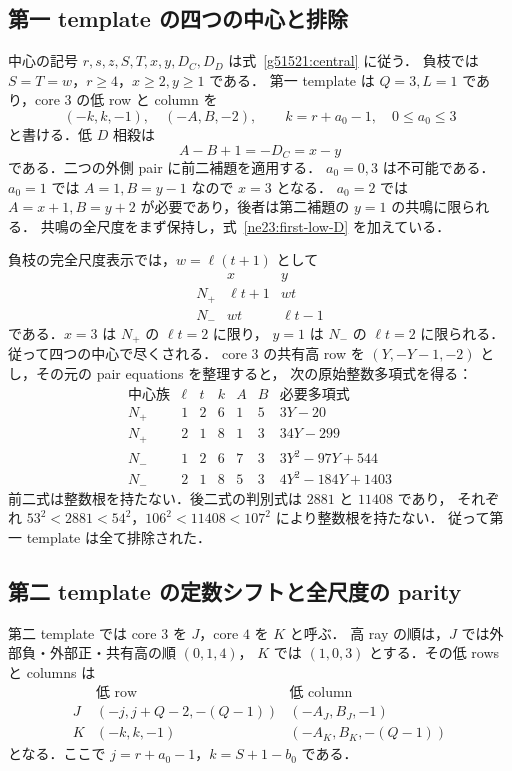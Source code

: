 \subsection{第一 template の四つの中心と排除}

中心の記号 $r,s,z,S,T,x,y,D_C,D_D$ は式~\eqref{g51521:central} に従う．
負枝では $S=T=w$，$r\ge4$，$x\ge2,y\ge1$ である．
第一 template は $Q=3,L=1$ であり，core $3$ の低 row と column を
\[
 (-k,k,-1),\quad (-A,B,-2),\qquad k=r+a_0-1,\quad0\le a_0\le3
\]
と書ける．低 $D$ 相殺は
\begin{equation}\label{ne23:first-low-D}
 A-B+1=-D_C=x-y
\end{equation}
である．二つの外側 pair に前二補題を適用する．
$a_0=0,3$ は不可能である．$a_0=1$ では $A=1,B=y-1$ なので $x=3$ となる．
$a_0=2$ では $A=x+1,B=y+2$ が必要であり，後者は第二補題の $y=1$ の共鳴に限られる．
共鳴の全尺度をまず保持し，式~\eqref{ne23:first-low-D} を加えている．

負枝の完全尺度表示では，$w=\ell(t+1)$ として
\[
\begin{array}{c|cc}
&x&y\\\hline
N_+&\ell t+1&wt\\
N_-&wt&\ell t-1
\end{array}
\]
である．$x=3$ は $N_+$ の $\ell t=2$ に限り，
$y=1$ は $N_-$ の $\ell t=2$ に限られる．従って四つの中心で尽くされる．
core $3$ の共有高 row を $(Y,-Y-1,-2)$ とし，その元の pair equations を整理すると，
次の原始整数多項式を得る：
\[
\begin{array}{c|cc|ccc|l}
\text{中心族}&\ell&t&k&A&B&\text{必要多項式}\\\hline
N_+&1&2&6&1&5&3Y-20\\
N_+&2&1&8&1&3&34Y-299\\
N_-&1&2&6&7&3&3Y^2-97Y+544\\
N_-&2&1&8&5&3&4Y^2-184Y+1403
\end{array}
\]
前二式は整数根を持たない．後二式の判別式は $2881$ と $11408$ であり，
それぞれ $53^2<2881<54^2$，$106^2<11408<107^2$ により整数根を持たない．
従って第一 template は全て排除された．

\subsection{第二 template の定数シフトと全尺度の parity}

第二 template では core $3$ を $J$，core $4$ を $K$ と呼ぶ．
高 ray の順は，$J$ では外部負・外部正・共有高の順 $(0,1,4)$，
$K$ では $(1,0,3)$ とする．その低 rows と columns は
\[
\begin{array}{c|c|c}
&\text{低 row}&\text{低 column}\\\hline
J&(-j,j+Q-2,-(Q-1))&(-A_J,B_J,-1)\\
K&(-k,k,-1)&(-A_K,B_K,-(Q-1))
\end{array}
\]
となる．ここで $j=r+a_0-1$，$k=S+1-b_0$ である．


